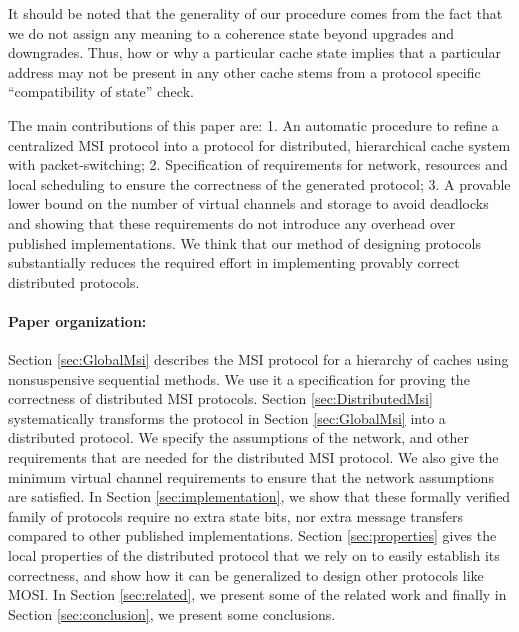 It should be noted that the generality of our procedure comes from the fact
that we do not assign any meaning to a coherence state beyond upgrades and
downgrades. Thus, how or why a particular cache state implies that a particular
address may not be present in any other cache stems from a protocol specific
``compatibility of state'' check. 

The main contributions of this paper are: 1. An automatic procedure to refine a
centralized MSI protocol into a protocol for
distributed, hierarchical cache system with packet-switching; 2. Specification
of requirements for network, resources and local scheduling to ensure the correctness of the generated protocol;
3. A provable lower bound on the number of virtual channels and storage
 to avoid deadlocks and showing that these requirements do not introduce any overhead over published implementations. We think
that our method of designing protocols substantially reduces the required
effort in implementing provably correct distributed protocols. 

\paragraph{Paper organization:} Section \ref{sec:GlobalMsi} describes the MSI
protocol for a hierarchy of caches using nonsuspensive sequential methods. We
use it a specification for proving the correctness of distributed MSI
protocols. Section \ref{sec:DistributedMsi} systematically transforms the
protocol in Section \ref{sec:GlobalMsi} into a distributed protocol. We specify
the assumptions of the network, and other requirements that are needed for the
distributed MSI protocol. We also give the minimum virtual channel requirements
to ensure that the network assumptions are satisfied. In Section
\ref{sec:implementation}, we show that these formally verified family of
protocols require no extra state bits, nor extra message transfers compared to
other published implementations. Section \ref{sec:properties} gives the local
properties of the distributed protocol that we rely on to easily establish its
correctness, and show how it can be generalized to design other protocols like
MOSI.
In Section \ref{sec:related}, we present some of the related work and finally
in Section \ref{sec:conclusion}, we present some conclusions.
